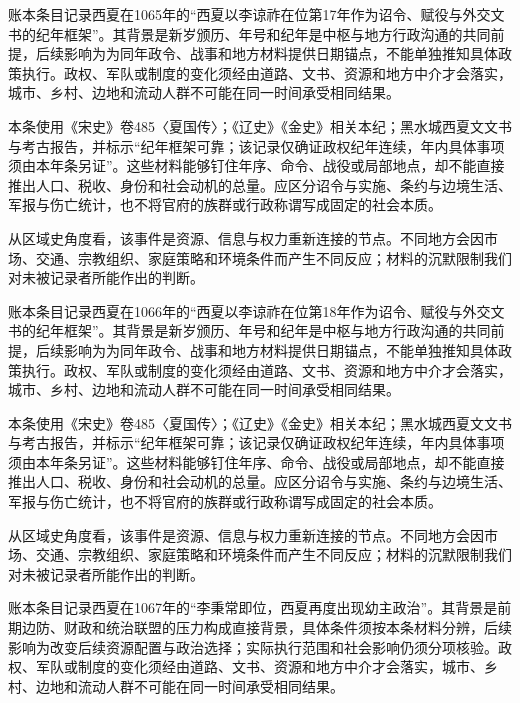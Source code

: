 账本条目记录西夏在1065年的“西夏以李谅祚在位第17年作为诏令、赋役与外交文书的纪年框架”。其背景是新岁颁历、年号和纪年是中枢与地方行政沟通的共同前提，后续影响为为同年政令、战事和地方材料提供日期锚点，不能单独推知具体政策执行。政权、军队或制度的变化须经由道路、文书、资源和地方中介才会落实，城市、乡村、边地和流动人群不可能在同一时间承受相同结果。

本条使用《宋史》卷485〈夏国传〉；《辽史》《金史》相关本纪；黑水城西夏文文书与考古报告，并标示“纪年框架可靠；该记录仅确证政权纪年连续，年内具体事项须由本年条另证”。这些材料能够钉住年序、命令、战役或局部地点，却不能直接推出人口、税收、身份和社会动机的总量。应区分诏令与实施、条约与边境生活、军报与伤亡统计，也不将官府的族群或行政称谓写成固定的社会本质。

从区域史角度看，该事件是资源、信息与权力重新连接的节点。不同地方会因市场、交通、宗教组织、家庭策略和环境条件而产生不同反应；材料的沉默限制我们对未被记录者所能作出的判断。

账本条目记录西夏在1066年的“西夏以李谅祚在位第18年作为诏令、赋役与外交文书的纪年框架”。其背景是新岁颁历、年号和纪年是中枢与地方行政沟通的共同前提，后续影响为为同年政令、战事和地方材料提供日期锚点，不能单独推知具体政策执行。政权、军队或制度的变化须经由道路、文书、资源和地方中介才会落实，城市、乡村、边地和流动人群不可能在同一时间承受相同结果。

本条使用《宋史》卷485〈夏国传〉；《辽史》《金史》相关本纪；黑水城西夏文文书与考古报告，并标示“纪年框架可靠；该记录仅确证政权纪年连续，年内具体事项须由本年条另证”。这些材料能够钉住年序、命令、战役或局部地点，却不能直接推出人口、税收、身份和社会动机的总量。应区分诏令与实施、条约与边境生活、军报与伤亡统计，也不将官府的族群或行政称谓写成固定的社会本质。

从区域史角度看，该事件是资源、信息与权力重新连接的节点。不同地方会因市场、交通、宗教组织、家庭策略和环境条件而产生不同反应；材料的沉默限制我们对未被记录者所能作出的判断。

账本条目记录西夏在1067年的“李秉常即位，西夏再度出现幼主政治”。其背景是前期边防、财政和统治联盟的压力构成直接背景，具体条件须按本条材料分辨，后续影响为改变后续资源配置与政治选择；实际执行范围和社会影响仍须分项核验。政权、军队或制度的变化须经由道路、文书、资源和地方中介才会落实，城市、乡村、边地和流动人群不可能在同一时间承受相同结果。

